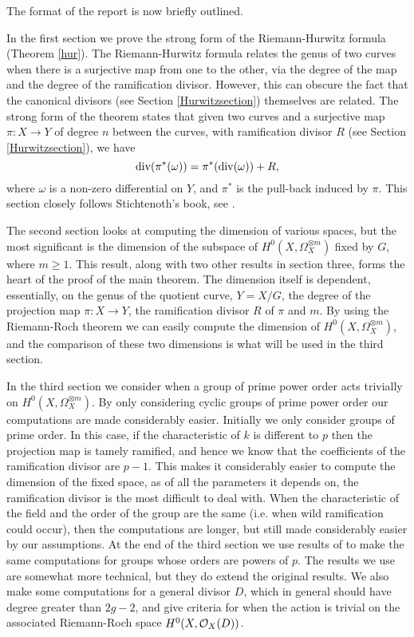   The format of the report is now briefly outlined.
  
  In the first section we prove the strong form of the Riemann-Hurwitz formula (Theorem \ref{hur}).
  The Riemann-Hurwitz formula relates the genus of two curves when there is a surjective map from one to the other, via the degree of the map and the degree of the ramification divisor.
  However, this can obscure the fact that the canonical divisors (see Section \ref{Hurwitzsection}) themselves are related.
  The strong form of the theorem states that given two curves and a surjective map $\pi:X\rightarrow Y$ of degree $n$ between the curves, with ramification divisor $R$ (see Section \ref{Hurwitzsection}), we have
  \[
 \operatorname{div} (\pi^* (\omega)) = \pi^*(\operatorname{div} (\omega)) + R,
  \]
where $\omega$ is a non-zero differential on $Y$, and $\pi^*$ is the pull-back induced by $\pi$.
This section closely follows Stichtenoth's book, see \cite{stichtenoth}.

The second section looks at computing the dimension of various spaces, but the most significant is the dimension of the subspace of $H^0(X,\Omega_X^{\otimes m})$ fixed by $G$, where $m\geq 1$.
This result, along with two other results in section three, forms the heart of the proof of the main theorem.
The dimension itself is dependent, essentially, on the genus of the quotient curve, $Y=X/G$, the degree of the projection map $\pi:X\rightarrow Y$, the ramification divisor $R$ of $\pi$ and $m$.
By using the Riemann-Roch theorem we can easily compute the dimension of $H^0(X,\Omega_X^{\otimes m})$, and the comparison of these two dimensions is what will be used in the third section.


In the third section we consider when a group of prime power order acts trivially on $H^0(X,\Omega_X^{\otimes m})$.
By only considering cyclic groups of prime power order our computations are made considerably easier.
Initially we only consider groups of prime order.
In this case, if the characteristic of $k$ is different to $p$ then the projection map is tamely ramified, and hence we know that the coefficients of the ramification divisor are $p-1$.
This makes it considerably easier to compute the dimension of the fixed space, as of all the parameters it depends on, the ramification divisor is the most difficult to deal with.
When the characteristic of the field and the order of the group are the same (i.e. when wild ramification could occur), then the computations are longer, but still made considerably easier by our assumptions.
At the end of the third section we use results of \cite{kako} to make the same computations for groups whose orders are powers of $p$.
The results we use are somewhat more technical, but they do extend the original results.
We also make some computations for a general divisor $D$, which in general should have degree greater than $2g-2$, and give criteria for when the action is trivial on the associated Riemann-Roch space $H^0(X,{\cal O}_X(D))$.

